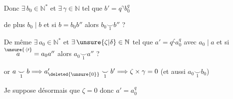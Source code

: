 Donc $\exists\,b_0\in\mathbb N^*$ et $\exists\,\gamma\in\mathbb N$ tel que $b'=q^\gamma b_0^q$ 

de plus $b_0\mid b$ et si $b=b_0 b''$ alors $b_0\mathrel{\underset{1}{\smile}}b''$ ?

De même $\exists\,a_0\in\mathbb N^*$ et $\exists\,\unsure{\zeta|\delta}\in\mathbb N$ tel que $a'=q^\zeta a_0^q$ avec $a_0\mid a$ et si $\overset{\unsure{\cdot|\prime}}{a}=a_0a''$ alors $a_0\mathrel{\underset{1}{\smile}}a''$ ?

or $a\mathrel{\underset{1}{\smile}}b\Longrightarrow a_{\deleted{\unsure{0}}}'\mathrel{\underset{1}{\smile}}b'\Longrightarrow\zeta\times\gamma=0$ (et aussi $a_0\mathrel{\underset{1}{\smile}}b_0$)

Je suppose désormais que $\zeta=0$ donc $a'=a_0^q$

